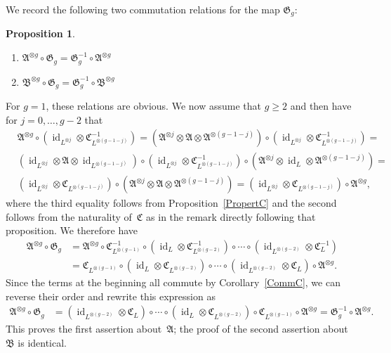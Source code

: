 \documentclass[12pt]{article}
\makeatletter
\newcounter{num}
\theoremstyle{definition}
\newtheorem{Proposition}[Satz]{Proposition}
\theoremstyle{break}
\renewenvironment{proof}[1][\proofname]{\par
\vspace{-5pt}%
\pushQED{\qed}%
\normalfont
\topsep0pt \partopsep0pt %
\trivlist
\item[\hskip\labelsep
\bfseries
#1\@addpunct{.}]\ignorespaces
}{%
\popQED\endtrivlist\@endpefalse
\addvspace{6pt plus 6pt} %
}
\DeclareMathOperator\id{id}
\newcommand{\fA}{\mathfrak{A}}
\newcommand{\fB}{\mathfrak{B}}
\newcommand{\fC}{\mathfrak{C}}
\newcommand{\fG}{\mathfrak{G}}
\renewcommand{\1}{\mathbbm{1}}
\newcommand{\ot}{\mathbin{\otimes}}
\makeatother
\begin{document}
We record the following two commutation relations for the map $\fG_g$:
\begin{Proposition} \label{PropCommABG}
\begin{enumerate}
\item
$\fA^{\ot g} \circ \fG_g = \fG_g^{-1} \circ \fA^{\ot g}$

\item
$\fB^{\ot g} \circ \fG_g = \fG_g^{-1} \circ \fB^{\ot g}$
\end{enumerate}
\end{Proposition}
\begin{proof}
For $g=1$, these relations are obvious. We now assume that $g \ge 2$ and then have for $j=0,\dots,g-2$ that
\begin{align*}
&\fA^{\ot g} \circ (\id_{L^{\ot j}} \ot \fC_{L^{\ot (g-1-j)}}^{-1}) =
(\fA^{\ot j} \ot \fA \ot \fA^{\ot (g-1-j)})
\circ (\id_{L^{\ot j}} \ot \fC_{L^{\ot (g-1-j)}}^{-1}) = \\
&(\id_{L^{\ot j}} \ot \fA \ot \id_{L^{\ot (g-1-j)}})
\circ (\id_{L^{\ot j}} \ot \fC_{L^{\ot (g-1-j)}}^{-1}) \circ
(\fA^{\ot j} \ot \id_{L} \ot \fA^{\ot (g-1-j)}) = \\
&(\id_{L^{\ot j}} \ot \fC_{L^{\ot (g-1-j)}})
\circ (\fA^{\ot j} \ot \fA \ot \fA^{\ot (g-1-j)}) =
(\id_{L^{\ot j}} \ot \fC_{L^{\ot (g-1-j)}}) \circ \fA^{\ot g},
\end{align*}
where the third equality follows from Proposition~\ref{PropertC} and the second follows from the naturality of~$\fC$ as in the remark directly following that proposition. We therefore have
\begin{align*}
\fA^{\ot g} \circ \fG_g &=
\fA^{\ot g} \circ \fC_{L^{\ot (g-1)}}^{-1} \circ (\id_L \ot \fC_{L^{\ot (g-2)}}^{-1})
\circ \cdots \circ (\id_{L^{\ot (g-2)}} \ot \fC_{L}^{-1}) \\
&= \fC_{L^{\ot (g-1)}} \circ (\id_L \ot \fC_{L^{\ot (g-2)}})
\circ \cdots \circ (\id_{L^{\ot (g-2)}} \ot \fC_{L}) \circ \fA^{\ot g}.
\end{align*}
Since the terms at the beginning all commute by Corollary~\ref{CommC}, we can reverse their order and rewrite this expression as
\begin{align*}
\fA^{\ot g} \circ \fG_g &= (\id_{L^{\ot (g-2)}} \ot \fC_{L}) \circ \cdots \circ (\id_L \ot \fC_{L^{\ot (g-2)}})
\circ \fC_{L^{\ot (g-1)}} \circ \fA^{\ot g} = \fG_g^{-1} \circ \fA^{\ot g}.
\end{align*}
This proves the first assertion about~$\fA$; the proof of the second assertion about~$\fB$ is identical.
\end{proof}
\end{document}
